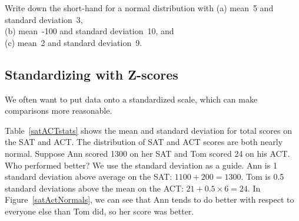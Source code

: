 \begin{exercisewrap}
\begin{nexercise}
Write down the short-hand for a normal distribution
with\footnotemark{}
(a)
    mean~5 and standard deviation~3, \\
(b)
    mean~-100 and standard deviation~10, and \\
(c)
    mean~2 and standard deviation~9.
\end{nexercise}
\end{exercisewrap}


\subsection{Standardizing with Z-scores}

\noindent%
We often want to put data onto a standardized scale,
which can make comparisons more reasonable.

\newcommand{\satmean}{1100}
\newcommand{\satsd}{200}
\newcommand{\actmean}{21}
\newcommand{\actsd}{6}
\newcommand{\annsatscore}{1300}
\newcommand{\annsatzscore}{1}
\newcommand{\tomsatscore}{24}
\newcommand{\tomsatzscore}{0.5}

\begin{examplewrap}
\begin{nexample}{Table~\vref{satACTstats} shows the mean
    and standard deviation for total scores on the SAT and ACT.
    The distribution of SAT and ACT scores are both nearly normal.
    Suppose Ann scored \annsatscore{} on her SAT and Tom scored
    \tomsatscore{} on his ACT.
    Who performed better?}
  \label{actSAT}%
  We use the standard deviation as a guide.
  Ann is \annsatzscore{} standard deviation above average
  on the SAT: $\satmean{} + \satsd{} = \annsatscore{}$.
  Tom is \tomsatzscore{} standard deviations above the mean
  on the ACT:
  $\actmean{} + \tomsatzscore{} \times \actsd{} = \tomsatscore{}$.
  In Figure~\ref{satActNormals}, we can see that Ann tends
  to do better with respect to everyone else than Tom did,
  so her score was better.
\end{nexample}
\end{examplewrap}

